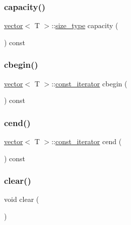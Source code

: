 \subsubsection{\texorpdfstring{capacity()}{capacity()}}
{\footnotesize\ttfamily \mbox{\hyperlink{classvector}{vector}}$<$ T $>$\+::\mbox{\hyperlink{classvector_ada51e68d31936547d3729c82daf6b7c6}{size\+\_\+type}} capacity (\begin{DoxyParamCaption}{ }\end{DoxyParamCaption}) const\hspace{0.3cm}{\ttfamily [noexcept]}}

\mbox{\label{classvector_ad468480e12a1eb71fafa4a717930d558}} 
\subsubsection{\texorpdfstring{cbegin()}{cbegin()}}
{\footnotesize\ttfamily \mbox{\hyperlink{classvector}{vector}}$<$ T $>$\+::\mbox{\hyperlink{classvector_a2fc97dce62b7053449cc868607540dba}{const\+\_\+iterator}} cbegin (\begin{DoxyParamCaption}{ }\end{DoxyParamCaption}) const\hspace{0.3cm}{\ttfamily [noexcept]}}

\mbox{\label{classvector_a4c2ff5d20e9d77b1936cafe08fdd10be}} 
\subsubsection{\texorpdfstring{cend()}{cend()}}
{\footnotesize\ttfamily \mbox{\hyperlink{classvector}{vector}}$<$ T $>$\+::\mbox{\hyperlink{classvector_a2fc97dce62b7053449cc868607540dba}{const\+\_\+iterator}} cend (\begin{DoxyParamCaption}{ }\end{DoxyParamCaption}) const\hspace{0.3cm}{\ttfamily [noexcept]}}

\mbox{\label{classvector_a03bfacfaaba9195e4498375659f43531}} 
\subsubsection{\texorpdfstring{clear()}{clear()}\hspace{0.1cm}{\footnotesize\ttfamily [1/15]}}
{\footnotesize\ttfamily void clear (\begin{DoxyParamCaption}{ }\end{DoxyParamCaption})\hspace{0.3cm}{\ttfamily [noexcept]}}

